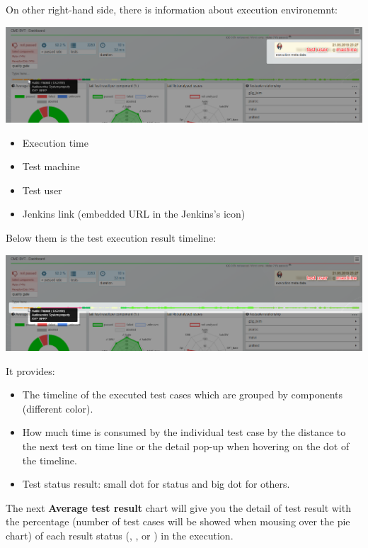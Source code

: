 On other right-hand side, there is information about execution environemnt:

\includegraphics[width=1\linewidth]{./pictures/dashboard/result_environment.png}
\begin{itemize}
   \item Execution time
   \item Test machine
   \item Test user
   \item Jenkins link (embedded URL in the Jenkins's icon)
\end{itemize}

Below them is the test execution result timeline:

\includegraphics[width=1\linewidth]{./pictures/dashboard/result_timeline.png}

It provides:
\begin{itemize}
   \item The timeline of the executed test cases which are grouped by components 
         (different color).
   \item How much time is consumed by the individual test case by the distance 
         to the next test on time line or the detail pop-up when hovering on the 
         dot of the timeline.
   \item Test status result: small dot for  status and big dot 
         for others.
\end{itemize}


The next \textbf{Average test result} chart will give you the detail of test 
result with the percentage (number of test cases will be showed when mousing 
over the pie chart) of each result status (, , 
 or ) in the execution. 

